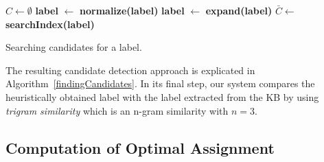 \documentclass{llncs}
\begin{document}
\begin{algorithm}[htb!]
$C \longleftarrow \emptyset$\;
{\bf label } $\longleftarrow$ {\bf normalize(label)}\;
{\bf label } $\longleftarrow$ {\bf expand(label)}\;
$ \displaystyle \bar C \longleftarrow$ {\bf searchIndex(label)}\;
\For{{\bf c} $\in \bar C$}{
    \If{$\neg${\bf c .matches([0-9]$^+$)}}{
        \If{{\bf trigramSimilarity(c, label)}$ \geq \sigma$}{
            \If{{\bf fitDomain(c)}} {
                $C \longleftarrow C \cup $ {\bf c}\;
            }
        }
    }
}
\caption{Searching candidates for a label.}
\label{findingCandidates}
\end{algorithm}

The resulting candidate detection approach is explicated in Algorithm~\ref{findingCandidates}.
In its final step, our system compares the heuristically obtained label with the label extracted from the KB by using \emph{trigram similarity} which is an n-gram similarity with $n=3$. 


\subsection{Computation of Optimal Assignment}
\end{document}
